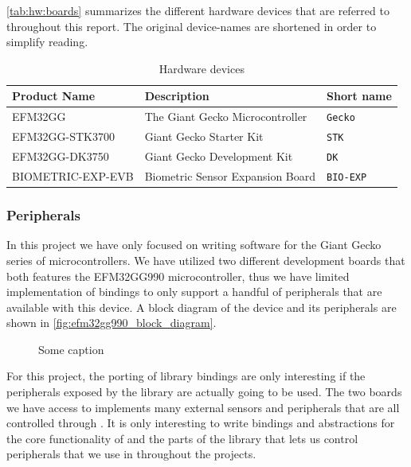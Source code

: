 \autoref{tab:hw:boards} summarizes the different hardware devices that are referred to throughout this report.
The original device-names are shortened in order to simplify reading.

\begin{table}[H]
  \begin{tabular}{l|l|l}
    \textbf{Product Name} & \textbf{Description} & \textbf{Short name} \\
    \hline
    EFM32GG & The Giant Gecko Microcontroller & \texttt{Gecko} \\
    EFM32GG-STK3700 & Giant Gecko Starter Kit & \texttt{STK} \\
    EFM32GG-DK3750 & Giant Gecko Development Kit & \texttt{DK} \\
    BIOMETRIC-EXP-EVB & Biometric Sensor Expansion Board & \texttt{BIO-EXP} \\
    \hline
  \end{tabular}
  \caption{Hardware devices}
  \label{tab:hw:boards}
\end{table}

\subsubsection{Peripherals}
\label{sub:peripherals}

In this project we have only focused on writing software for the Giant Gecko series of microcontrollers.
We have utilized two different development boards that both features the EFM32GG990 microcontroller,
thus we have limited implementation of bindings to only support a handful of peripherals that are
available with this device. A block diagram of the device and its peripherals are shown in
\autoref{fig:efm32gg990_block_diagram}.

\begin{figure}[b]
\centering
{}
\caption{Some caption}
\label{fig:efm32gg990_block_diagram}
\end{figure}

For this project, the porting of library bindings are only interesting if the peripherals exposed by
the library are actually going to be used. The two boards we have access to implements many external
sensors and peripherals that are all controlled through \emlib. It is only interesting to write
bindings and abstractions for the core functionality of \emlib and the parts of the library that
lets us control peripherals that we use in throughout the projects.
